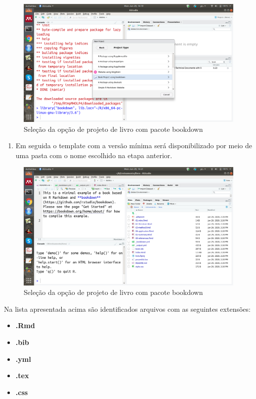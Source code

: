 \documentclass[
  oneside]{book}
\providecommand{\tightlist}{%
  \setlength{\itemsep}{0pt}\setlength{\parskip}{0pt}}
\begin{document}
\begin{figure}
\centering
\includegraphics{fig/select_Book_Project_with_bookdown.png}
\caption{Seleção da opção de projeto de livro com pacote bookdown}
\end{figure}

\begin{enumerate}
\def\labelenumi{\arabic{enumi}.}
\setcounter{enumi}{3}
\tightlist
\item
  Em seguida o template com a versão mínima será
  disponibilizado por meio de uma pasta com o nome escolhido na etapa anterior.
\end{enumerate}

\begin{figure}
\centering
\includegraphics{fig/outra.png}
\caption{Seleção da opção de projeto de livro com pacote bookdown}
\end{figure}

Na lista apresentada acima são identificados
arquivos com as seguintes extensões:

\begin{itemize}
\tightlist
\item
  \textbf{.Rmd}
\item
  \textbf{.bib}
\item
  \textbf{.yml}
\item
  \textbf{.tex}
\item
  \textbf{.css}
\end{itemize}
\end{document}
